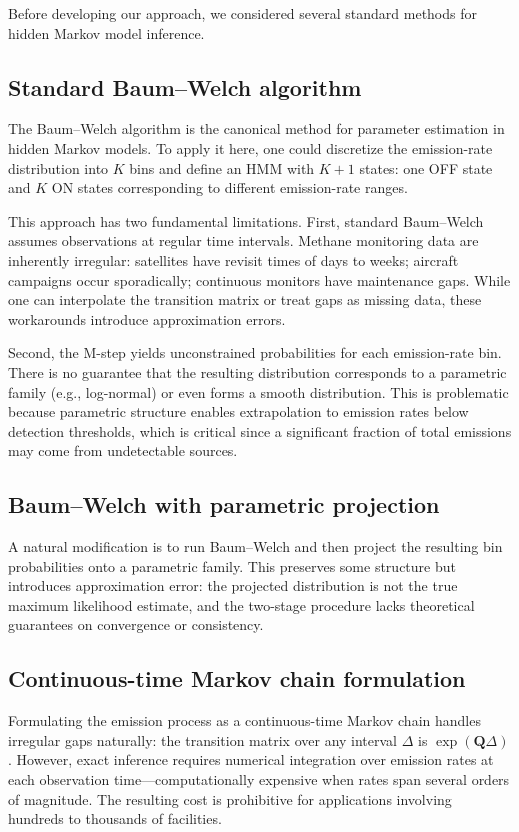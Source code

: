 \documentclass[11pt]{article}
\begin{document}
Before developing our approach, we considered several standard methods for hidden Markov model inference.

\subsection{Standard Baum--Welch algorithm}

The Baum--Welch algorithm is the canonical method for parameter estimation in hidden Markov models. To apply it here, one could discretize the emission-rate distribution into $K$ bins and define an HMM with $K+1$ states: one OFF state and $K$ ON states corresponding to different emission-rate ranges.

This approach has two fundamental limitations. First, standard Baum--Welch assumes observations at regular time intervals. Methane monitoring data are inherently irregular: satellites have revisit times of days to weeks; aircraft campaigns occur sporadically; continuous monitors have maintenance gaps. While one can interpolate the transition matrix or treat gaps as missing data, these workarounds introduce approximation errors.

Second, the M-step yields unconstrained probabilities for each emission-rate bin. There is no guarantee that the resulting distribution corresponds to a parametric family (e.g., log-normal) or even forms a smooth distribution. This is problematic because parametric structure enables extrapolation to emission rates below detection thresholds, which is critical since a significant fraction of total emissions may come from undetectable sources.

\subsection{Baum--Welch with parametric projection}

A natural modification is to run Baum--Welch and then project the resulting bin probabilities onto a parametric family. This preserves some structure but introduces approximation error: the projected distribution is not the true maximum likelihood estimate, and the two-stage procedure lacks theoretical guarantees on convergence or consistency.

\subsection{Continuous-time Markov chain formulation}

Formulating the emission process as a continuous-time Markov chain handles irregular gaps naturally: the transition matrix over any interval $\Delta$ is $\exp(\mathbf{Q}\Delta)$. However, exact inference requires numerical integration over emission rates at each observation time---computationally expensive when rates span several orders of magnitude. The resulting cost is prohibitive for applications involving hundreds to thousands of facilities.
\end{document}

